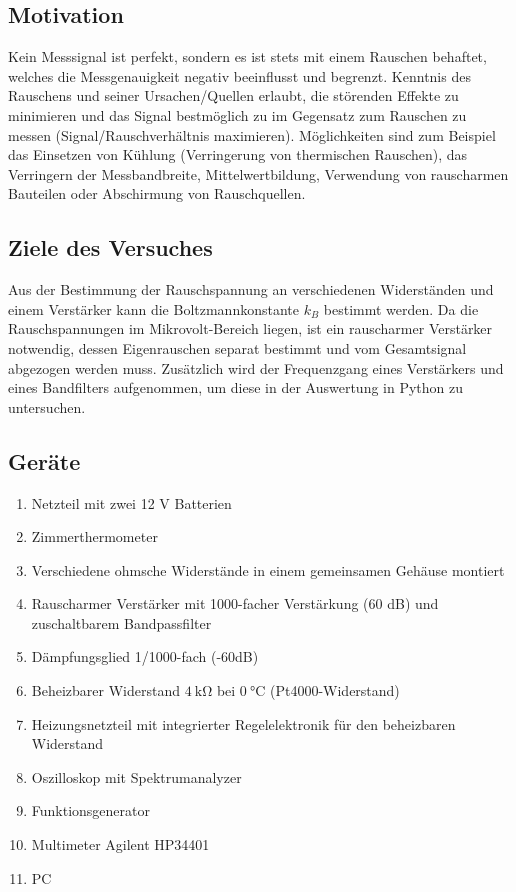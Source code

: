 \subsection{Motivation}
Kein Messsignal ist perfekt, sondern es ist stets mit einem Rauschen behaftet, welches die Messgenauigkeit negativ beeinflusst und begrenzt. Kenntnis des Rauschens und seiner Ursachen/Quellen erlaubt, die störenden Effekte zu minimieren und das Signal bestmöglich zu im Gegensatz zum Rauschen zu messen (Signal/Rauschverhältnis maximieren). Möglichkeiten sind zum Beispiel das Einsetzen von Kühlung (Verringerung von thermischen Rauschen), das Verringern der Messbandbreite, Mittelwertbildung, Verwendung von rauscharmen Bauteilen oder Abschirmung von Rauschquellen.

\subsection{Ziele des Versuches}
Aus der Bestimmung der Rauschspannung an verschiedenen Widerständen und einem Verstärker kann die Boltzmannkonstante \(k_B\) bestimmt werden. Da die Rauschspannungen im Mikrovolt-Bereich liegen, ist ein rauscharmer Verstärker notwendig, dessen Eigenrauschen separat bestimmt und vom Gesamtsignal abgezogen werden muss. Zusätzlich wird der Frequenzgang eines Verstärkers und eines Bandfilters aufgenommen, um diese in der Auswertung in Python zu untersuchen.

\subsection{Geräte}
\begin{enumerate}
    \item Netzteil mit zwei 12 V Batterien
    \item Zimmerthermometer
    \item Verschiedene ohmsche Widerstände in einem gemeinsamen Gehäuse montiert
    \item Rauscharmer Verstärker mit 1000-facher Verstärkung (60 dB) und zuschaltbarem Bandpassfilter
    \item Dämpfungsglied 1/1000-fach (-60dB)
    \item Beheizbarer Widerstand \(\qty{4}{\kilo\ohm}\) bei \(\qty{0}{\degreeCelsius}\) (Pt4000-Widerstand)
    \item Heizungsnetzteil mit integrierter Regelelektronik für den beheizbaren Widerstand
    \item Oszilloskop mit Spektrumanalyzer
    \item Funktionsgenerator
    \item Multimeter Agilent HP34401
    \item PC
\end{enumerate}

